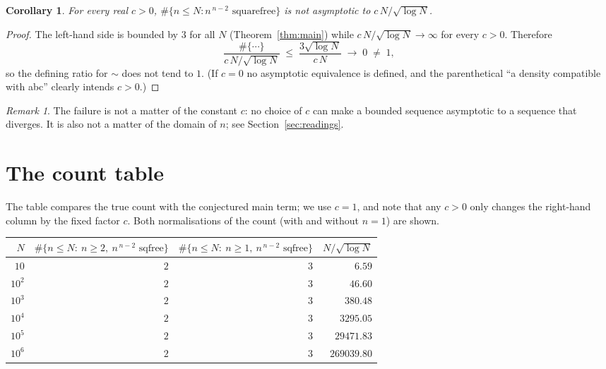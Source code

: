 \documentclass[11pt]{article}
\newtheorem{corollary}[theorem]{Corollary}
\theoremstyle{definition}
\theoremstyle{remark}
\newtheorem{remark}[theorem]{Remark}
\begin{document}
\begin{corollary}\label{cor:unbounded}
For every real $c > 0$, $\#\{n \le N : n^{\,n-2} \text{ squarefree}\}$ is
\emph{not} asymptotic to $c\,N/\sqrt{\log N}$.
\end{corollary}

\begin{proof}
The left-hand side is bounded by $3$ for all $N$ (Theorem~\ref{thm:main}) while
$c\,N/\sqrt{\log N} \to \infty$ for every $c>0$. Therefore
\[
\frac{\#\{\cdots\}}{c\,N/\sqrt{\log N}} \;\le\; \frac{3\sqrt{\log N}}{c\,N}
\;\longrightarrow\; 0 \;\neq\; 1 ,
\]
so the defining ratio for $\sim$ does not tend to $1$. (If $c=0$ no
asymptotic equivalence is defined, and the parenthetical ``a density compatible
with abc'' clearly intends $c>0$.)
\end{proof}

\begin{remark}
The failure is not a matter of the constant $c$: no choice of $c$ can make a
bounded sequence asymptotic to a sequence that diverges. It is also not a
matter of the domain of $n$; see Section~\ref{sec:readings}.
\end{remark}

\section{The count table}\label{sec:table}

The table compares the true count with the conjectured main term; we use $c=1$,
and note that any $c>0$ only changes the right-hand column by the fixed factor
$c$. Both normalisations of the count (with and without $n=1$) are shown.

\begin{center}
\begin{tabular}{r r r r}
\toprule
$N$ & $\#\{n\le N:\ n\ge 2,\ n^{\,n-2}\text{ sqfree}\}$ &
    $\#\{n\le N:\ n\ge 1,\ n^{\,n-2}\text{ sqfree}\}$ &
    $N/\sqrt{\log N}$ \\
\midrule
$10$        & $2$ & $3$ & $6.59$ \\
$10^{2}$    & $2$ & $3$ & $46.60$ \\
$10^{3}$    & $2$ & $3$ & $380.48$ \\
$10^{4}$    & $2$ & $3$ & $3295.05$ \\
$10^{5}$    & $2$ & $3$ & $29471.83$ \\
$10^{6}$    & $2$ & $3$ & $269039.80$ \\
\bottomrule
\end{tabular}
\end{center}
\end{document}
